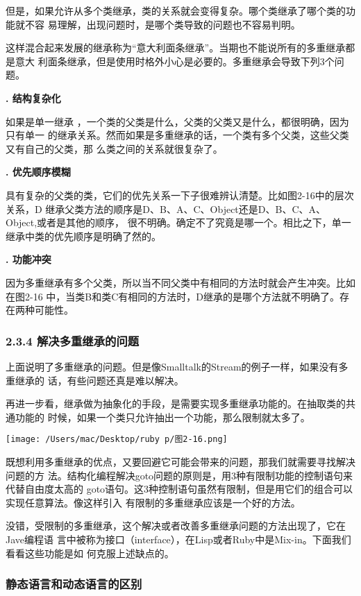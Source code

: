 \documentclass[11pt]{ctexart}
\begin{document}
但是，如果允许从多个类继承，类的关系就会变得复杂。哪个类继承了哪个类的功能就不容
易理解，出现问题时，是哪个类导致的问题也不容易判明。

这样混合起来发展的继承称为“意大利面条继承”。当期也不能说所有的多重继承都是意大
利面条继承，但是使用时格外小心是必要的。多重继承会导致下列3个问题。

\textbf{. 结构复杂化}

如果是单一继承 ，一个类的父类是什么，父类的父类又是什么，都很明确，因为只有单一
的继承关系。然而如果是多重继承的话，一个类有多个父类，这些父类又有自己的父类，那
么类之间的关系就很复杂了。

\textbf{. 优先顺序模糊}

具有复杂的父类的类，它们的优先关系一下子很难辨认清楚。比如图2-16中的层次关系，D
继承父类方法的顺序是D、B、A、C、Object还是D、B、C、A、Object,或者是其他的顺序，
很不明确。确定不了究竟是哪一个。相比之下，单一继承中类的优先顺序是明确了然的。

\textbf{. 功能冲突}

因为多重继承有多个父类，所以当不同父类中有相同的方法时就会产生冲突。比如在图2-16
中，当类B和类C有相同的方法时，D继承的是哪个方法就不明确了。存在两种可能性。
\subsubsection{2.3.4 解决多重继承的问题}
\label{sec:org2d12206}

上面说明了多重继承的问题。但是像Smalltalk的Stream的例子一样，如果没有多重继承的
话，有些问题还真是难以解决。

再进一步看，继承做为抽象化的手段，是需要实现多重继承功能的。在抽取类的共通功能的
时候，如果一个类只允许抽出一个功能，那么限制就太多了。
\begin{center}
\texttt{[image: /Users/mac/Desktop/ruby p/图2-16.png]}
\end{center}

既想利用多重继承的优点，又要回避它可能会带来的问题，那我们就需要寻找解决问题的方
法。结构化编程解决goto问题的原则是，用3种有限制功能的控制语句来代替自由度太高的
goto语句。这3种控制语句虽然有限制，但是用它们的组合可以实现任意算法。像这样引入
有限制的多重继承应该是一个好的方法。

没错，受限制的多重继承，这个解决或者改善多重继承问题的方法出现了，它在Jave编程语
言中被称为接口（interface），在Lisp或者Ruby中是Mix-in。下面我们看看这些功能是如
何克服上述缺点的。
\subsubsection{静态语言和动态语言的区别}
\label{sec:org1e1a51d}
\end{document}

